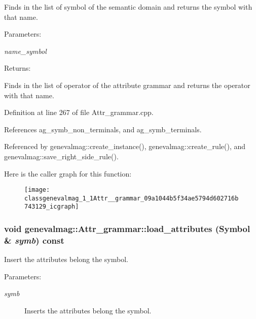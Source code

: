 Finds in the list of symbol of the semantic domain and returns the symbol with that name. \begin{Desc}
\item[Parameters:]
\begin{description}
\item[{\em name\_\-symbol}]\end{description}
\end{Desc}
\begin{Desc}
\item[Returns:]\end{Desc}
Finds in the list of operator of the attribute grammar and returns the operator with that name. 

Definition at line 267 of file Attr\_\-grammar.cpp.

References ag\_\-symb\_\-non\_\-terminals, and ag\_\-symb\_\-terminals.

Referenced by genevalmag::create\_\-instance(), genevalmag::create\_\-rule(), and genevalmag::save\_\-right\_\-side\_\-rule().

Here is the caller graph for this function:\nopagebreak
\begin{figure}[H]
\begin{center}
\leavevmode
\texttt{[image: classgenevalmag\_1\_1Attr\_\_grammar\_09a1044b5f34ae5794d602716b743129\_icgraph]}
\end{center}
\end{figure}
\hypertarget{classgenevalmag_1_1Attr__grammar_faa4c9d59c02bb170691cad72bf97c68}{
\subsubsection[{load\_\-attributes}]{\setlength{\rightskip}{0pt plus 5cm}void genevalmag::Attr\_\-grammar::load\_\-attributes ({\bf Symbol} \& {\em symb}) const}}
\label{classgenevalmag_1_1Attr__grammar_faa4c9d59c02bb170691cad72bf97c68}


Insert the attributes belong the symbol. \begin{Desc}
\item[Parameters:]
\begin{description}
\item[{\em symb}]Inserts the attributes belong the symbol. \end{description}
\end{Desc}


